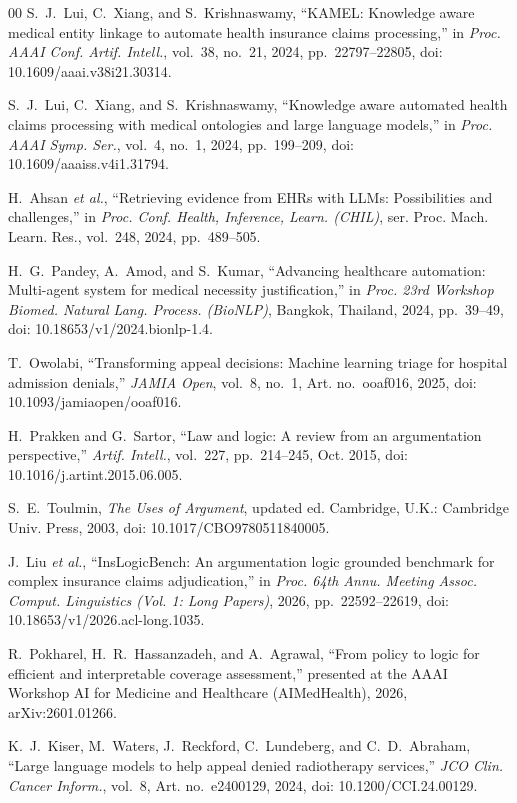 \documentclass[conference]{IEEEtran}
\begin{document}
\begin{thebibliography}{00}
S.~J.~Lui, C.~Xiang, and S.~Krishnaswamy, ``KAMEL: Knowledge aware medical entity linkage to automate health insurance claims processing,'' in \emph{Proc. AAAI Conf. Artif. Intell.}, vol.~38, no.~21, 2024, pp.~22797--22805, doi: 10.1609/aaai.v38i21.30314.

S.~J.~Lui, C.~Xiang, and S.~Krishnaswamy, ``Knowledge aware automated health claims processing with medical ontologies and large language models,'' in \emph{Proc. AAAI Symp. Ser.}, vol.~4, no.~1, 2024, pp.~199--209, doi: 10.1609/aaaiss.v4i1.31794.

H.~Ahsan \textit{et al.}, ``Retrieving evidence from EHRs with LLMs: Possibilities and challenges,'' in \emph{Proc. Conf. Health, Inference, Learn. (CHIL)}, ser. Proc. Mach. Learn. Res., vol.~248, 2024, pp.~489--505.

H.~G.~Pandey, A.~Amod, and S.~Kumar, ``Advancing healthcare automation: Multi-agent system for medical necessity justification,'' in \emph{Proc. 23rd Workshop Biomed. Natural Lang. Process. (BioNLP)}, Bangkok, Thailand, 2024, pp.~39--49, doi: 10.18653/v1/2024.bionlp-1.4.

T.~Owolabi, ``Transforming appeal decisions: Machine learning triage for hospital admission denials,'' \emph{JAMIA Open}, vol.~8, no.~1, Art. no.~ooaf016, 2025, doi: 10.1093/jamiaopen/ooaf016.

H.~Prakken and G.~Sartor, ``Law and logic: A review from an argumentation perspective,'' \emph{Artif. Intell.}, vol.~227, pp.~214--245, Oct. 2015, doi: 10.1016/j.artint.2015.06.005.

S.~E.~Toulmin, \emph{The Uses of Argument}, updated ed. Cambridge, U.K.: Cambridge Univ. Press, 2003, doi: 10.1017/CBO9780511840005.

J.~Liu \textit{et al.}, ``InsLogicBench: An argumentation logic grounded benchmark for complex insurance claims adjudication,'' in \emph{Proc. 64th Annu. Meeting Assoc. Comput. Linguistics (Vol. 1: Long Papers)}, 2026, pp.~22592--22619, doi: 10.18653/v1/2026.acl-long.1035.

R.~Pokharel, H.~R.~Hassanzadeh, and A.~Agrawal, ``From policy to logic for efficient and interpretable coverage assessment,'' presented at the AAAI Workshop AI for Medicine and Healthcare (AIMedHealth), 2026, arXiv:2601.01266.

K.~J.~Kiser, M.~Waters, J.~Reckford, C.~Lundeberg, and C.~D.~Abraham, ``Large language models to help appeal denied radiotherapy services,'' \emph{JCO Clin. Cancer Inform.}, vol.~8, Art. no.~e2400129, 2024, doi: 10.1200/CCI.24.00129.


\end{thebibliography}
\end{document}
